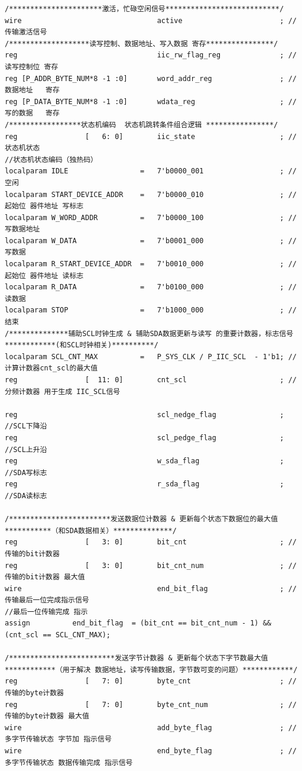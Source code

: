 \documentclass[a4paper,10pt]{article}
\begin{document}
\begin{lstlisting}[caption=iic_drive.v]
/**********************激活，忙碌空闲信号***************************/
wire                                active                       ; //传输激活信号
/*******************读写控制、数据地址、写入数据 寄存****************/
reg                                 iic_rw_flag_reg              ; //读写控制位 寄存
reg [P_ADDR_BYTE_NUM*8 -1 :0]       word_addr_reg                ; //数据地址   寄存
reg [P_DATA_BYTE_NUM*8 -1 :0]       wdata_reg                    ; //写的数据   寄存
/*****************状态机编码  状态机跳转条件组合逻辑 ****************/
reg                [   6: 0]        iic_state                    ; //状态机状态
//状态机状态编码（独热码）
localparam IDLE                 =   7'b0000_001                  ; //空闲
localparam START_DEVICE_ADDR    =   7'b0000_010                  ; //起始位 器件地址 写标志
localparam W_WORD_ADDR          =   7'b0000_100                  ; //写数据地址  
localparam W_DATA               =   7'b0001_000                  ; //写数据
localparam R_START_DEVICE_ADDR  =   7'b0010_000                  ; //起始位 器件地址 读标志
localparam R_DATA               =   7'b0100_000                  ; //读数据
localparam STOP                 =   7'b1000_000                  ; //结束
/**************辅助SCL时钟生成 & 辅助SDA数据更新与读写 的重要计数器，标志信号 ************(和SCL时钟相关)**********/
localparam SCL_CNT_MAX          =   P_SYS_CLK / P_IIC_SCL  - 1'b1; //计算计数器cnt_scl的最大值
reg                [  11: 0]        cnt_scl                      ; //分频计数器 用于生成 IIC_SCL信号

reg                                 scl_nedge_flag               ; //SCL下降沿
reg                                 scl_pedge_flag               ; //SCL上升沿
reg                                 w_sda_flag                   ; //SDA写标志 
reg                                 r_sda_flag                   ; //SDA读标志

/************************发送数据位计数器 & 更新每个状态下数据位的最大值***********（和SDA数据相关）**************/
reg                [   3: 0]        bit_cnt                      ; //传输的bit计数器 
reg                [   3: 0]        bit_cnt_num                  ; //传输的bit计数器 最大值
wire                                end_bit_flag                 ; //传输最后一位完成指示信号
//最后一位传输完成 指示
assign          end_bit_flag  = (bit_cnt == bit_cnt_num - 1) && (cnt_scl == SCL_CNT_MAX); 
                                
/*************************发送字节计数器 & 更新每个状态下字节数最大值************（用于解决 数据地址，读写传输数据，字节数可变的问题）************/
reg                [   7: 0]        byte_cnt                     ; //传输的byte计数器
reg                [   7: 0]        byte_cnt_num                 ; //传输的byte计数器 最大值
wire                                add_byte_flag                ; //多字节传输状态 字节加 指示信号
wire                                end_byte_flag                ; //多字节传输状态 数据传输完成 指示信号


\end{lstlisting}
\end{document}

